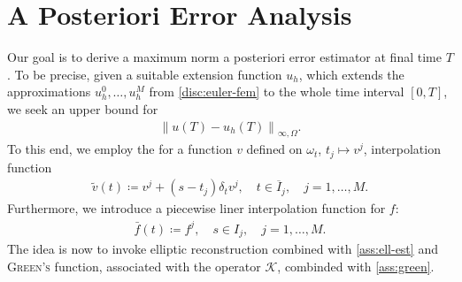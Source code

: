 \documentclass[11pt, a4paper]{article}
\newcommand{\mK}{\mathcal{K}}
\newcommand{\norm}[1]{\left\|#1\right\|}
\begin{document}
	\section{A Posteriori Error Analysis}
	Our goal is to derive a maximum norm a posteriori error estimator at final time \(T\). To be precise, given a suitable extension function \(u_h\), which extends the approximations \(u^0_h, \dots, u^M_h\) from \autoref{disc:euler-fem} to the whole time interval \([0,T]\), we seek an 
	upper bound for 
	\begin{gather*}
		\norm{u(T)-u_h(T)}_{\infty, \Omega}. 
	\end{gather*}
	To this end, we employ the for a function \(v\) defined on \(\omega_t\), \mbox{\(t_j \mapsto v^j\)}, interpolation function 
	\begin{gather*}
		\tilde{v}(t) \coloneqq v^j + (s-t_j) \delta_t v^j, \quad t\in \overline{I}_j, \quad j=1,\dots,M.
	\end{gather*}
	Furthermore, we introduce a piecewise liner interpolation function for \(f\):
	\begin{gather*}
		\bar{f}(t) \coloneqq f^j, \quad s\in I_j, \quad j=1,\dots,M.
	\end{gather*}
	The idea is now to invoke elliptic reconstruction combined with \autoref{ass:ell-est} and \textsc{Green's} function, associated with the operator \(\mK\), combinded with \autoref{ass:green}. 
\end{document}
